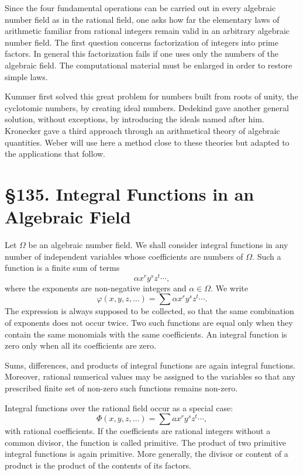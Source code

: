 \documentclass[12pt,a4paper]{article}
\newcommand{\webersection}[2]{\clearpage\section*{\S #1. #2}}
\begin{document}
Since the four fundamental operations can be carried out in every algebraic number field as in the rational field, one asks how far the elementary laws of arithmetic familiar from rational integers remain valid in an arbitrary algebraic number field.  The first question concerns factorization of integers into prime factors.  In general this factorization fails if one uses only the numbers of the algebraic field.  The computational material must be enlarged in order to restore simple laws.

Kummer first solved this great problem for numbers built from roots of unity, the cyclotomic numbers, by creating ideal numbers.  Dedekind gave another general solution, without exceptions, by introducing the ideals named after him.  Kronecker gave a third approach through an arithmetical theory of algebraic quantities.  Weber will use here a method close to these theories but adapted to the applications that follow.

\webersection{135}{Integral Functions in an Algebraic Field}

Let \(\Omega\) be an algebraic number field.  We shall consider integral functions in any number of independent variables whose coefficients are numbers of \(\Omega\).  Such a function is a finite sum of terms
\[
 \alpha x^r y^s z^t\cdots,
\]
where the exponents are non-negative integers and \(\alpha\in\Omega\).  We write
\begin{equation}
 \varphi(x,y,z,\ldots)=\sum \alpha x^r y^s z^t\cdots . \tag{1}
\end{equation}
The expression is always supposed to be collected, so that the same combination of exponents does not occur twice.  Two such functions are equal only when they contain the same monomials with the same coefficients.  An integral function is zero only when all its coefficients are zero.

Sums, differences, and products of integral functions are again integral functions.  Moreover, rational numerical values may be assigned to the variables so that any prescribed finite set of non-zero such functions remains non-zero.

Integral functions over the rational field occur as a special case:
\[
 \Phi(x,y,z,\ldots)=\sum a x^r y^s z^t\cdots,
\]
with rational coefficients.  If the coefficients are rational integers without a common divisor, the function is called primitive.  The product of two primitive integral functions is again primitive.  More generally, the divisor or content of a product is the product of the contents of its factors.
\end{document}
